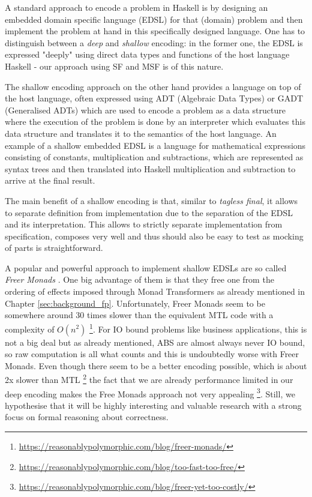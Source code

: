 A standard approach to encode a problem in Haskell is by designing an embedded domain specific language (EDSL) for that (domain) problem and then implement the problem at hand in this specifically designed language. One has to distinguish between a \textit{deep} and \textit{shallow} encoding: in the former one, the EDSL is expressed "deeply" using direct data types and functions of the host language Haskell - our approach using SF and MSF is of this nature.

The shallow encoding approach on the other hand provides a language on top of the host language, often expressed using ADT (Algebraic Data Types) or GADT (Generalised ADTs) which are used to encode a problem as a data structure where the execution of the problem is done by an interpreter which evaluates this data structure and translates it to the semantics of the host language. An example of a shallow embedded EDSL is a language for mathematical expressions consisting of constants, multiplication and subtractions, which are represented as syntax trees and then translated into Haskell multiplication and subtraction to arrive at the final result.

The main benefit of a shallow encoding is that, similar to \textit{tagless final}, it allows to separate definition from implementation due to the separation of the EDSL and its interpretation. This allows to strictly separate implementation from specification, composes very well and thus should also be easy to test as mocking of parts is straightforward.

\medskip

A popular and powerful approach to implement shallow EDSLs are so called \textit{Freer Monads} \cite{rivas_notions_2014}. One big advantage of them is that they free one from the ordering of effects imposed through Monad Transformers as already mentioned in Chapter \ref{sec:background_fp}. Unfortunately, Freer Monads seem to be somewhere around 30 times slower than the equivalent MTL code with a complexity of $O(n^2)$ \footnote{\url{https://reasonablypolymorphic.com/blog/freer-monads/}}. For IO bound problems like business applications, this is not a big deal but as already mentioned, ABS are almost always never IO bound, so raw computation is all what counts and this is undoubtedly worse with Freer Monads. Even though there seem to be a better encoding possible, which is about 2x slower than MTL \footnote{\url{https://reasonablypolymorphic.com/blog/too-fast-too-free/}} the fact that we are already performance limited in our deep encoding makes the Free Monads approach not very appealing \footnote{\url{https://reasonablypolymorphic.com/blog/freer-yet-too-costly/}}. Still, we hypothesise that it will be highly interesting and valuable research with a strong focus on formal reasoning about correctness.

